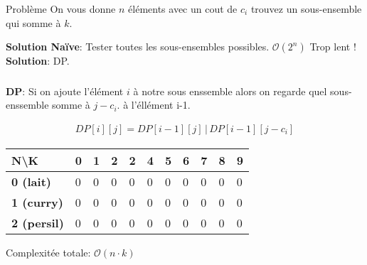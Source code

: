 
\begin{frame}
    \frametitle{\problemtitle}
    \begin{block}
        {Problème} On vous donne $n$ éléments avec un cout de $c_i$ trouvez un sous-ensemble qui somme à $k$.
    \end{block}
    \pause
    \textbf{Solution Naïve}: Tester toutes les sous-ensembles possibles. $\mathcal O(2^n)$ Trop lent ! \\
    \pause
    \textbf{Solution}: DP. \\
    \pause
    
\end{frame}
\begin{frame}
    \frametitle{\problemtitle}
    \textbf{DP}: Si on ajoute l'élément $i$ à notre sous enssemble alors on regarde quel sous-enssemble somme à $j-c_i$. à l'éllément i-1.
    
    \begin{align*}
        DP[i][j] = DP[i-1][j] \,|\, DP[i-1][j-c_i]
    \end{align*}
    
    \begin{table}[]
      \begin{tabular}{|l|l|l|l|l|l|l|l|l|l|l|}
      \hline
      \textbf{N\textbackslash{}K} & \textbf{0} & \textbf{1} & \textbf{2} & \textbf{2} & \textbf{4} & \textbf{5} & \textbf{6} & \textbf{7} & \textbf{8} & \textbf{9} \\ \hline
      \textbf{0 (lait)}   & 0 & 0 & 0 & 0 & 0 & 0 & 0 & 0 & 0 & 0 \\ \hline
      \textbf{1 (curry)}  & 0 & 0 & 0 & 0 & 0 & 0 & 0 & 0 & 0 & 0 \\ \hline
      \textbf{2 (persil)} & 0 & 0 & 0 & 0 & 0 & 0 & 0 & 0 & 0 & 0 \\ \hline
      \end{tabular}
    \end{table}
    
    Complexitée totale: $\mathcal O(n \cdot k)$
\end{frame}
